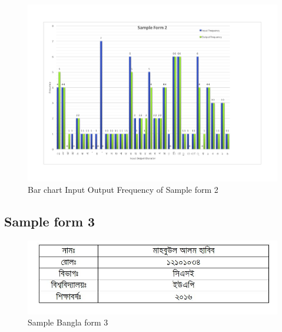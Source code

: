 \begin{figure}[H]
\centering
\includegraphics[width=1\textwidth]{Bform2.pdf}
\caption {Bar chart Input Output Frequency of Sample form 2}
\label {fig:Bbar2}
\end{figure}



\subsection{Sample form 3}
\begin{figure}[H]
\centering
\includegraphics[width=1\textwidth]{formBen03.JPG}
\caption {Sample Bangla form 3}
\label {fig:FormBan3}
\end{figure}



